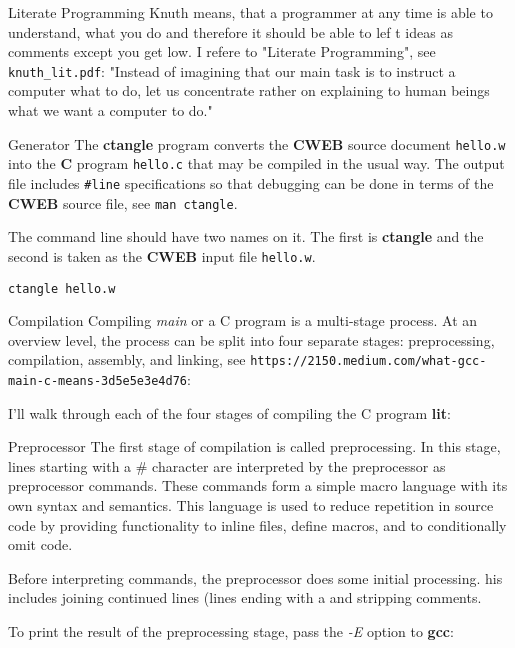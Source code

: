 

Literate Programming \hfill \break
Knuth means, that a programmer at any time is able to understand,
what you do and therefore it should be able to lef t ideas
as comments except you get low. I refere to "Literate Programming", see
{\tt knuth\_lit.pdf}: "Instead of imagining that our
main task is to instruct a computer what to do, let us
concentrate rather on explaining to human beings what
we want a computer to do."

\fi

Generator  \hfill \break
The {\bf ctangle} program converts the {\bf CWEB} source document {\tt hello.w}
into the {\bf C} program {\tt hello.c} that may be compiled in the usual way.
The output file includes{ \tt \#line} specifications so that debugging can be
done in terms of the {\bf CWEB} source file, see {\tt man ctangle}.

\vskip 4pt \noindent
The command line should have two names on it. The first is {\bf ctangle} and
the
second is taken as the {\bf CWEB} input file {\tt hello.w}.

\vskip 4pt \noindent
{\tt ctangle hello.w}

\fi

Compilation \hfill \break
Compiling {\sl main} or a C program is a multi-stage process. At an overview
level, the process can be split into four separate stages: preprocessing,
compilation, assembly, and linking, \hfill \break
see {\tt https://2150.medium.com/what-gcc-main-c-means-3d5e5e3e4d76}:

\vskip 4pt \noindent
I'll walk through each of the four stages of compiling the C program {\bf lit}:

\fi

Preprocessor  \hfill \break
The first stage of compilation is called preprocessing. In this stage,
lines starting with a \# character are interpreted by the preprocessor as
preprocessor commands. These commands form a simple macro language with its own
syntax and semantics. This language is used to reduce repetition in source code
by providing functionality to inline files, define macros, and to conditionally
omit code.

\vskip 4pt \noindent
Before interpreting commands, the preprocessor does some initial processing.
his includes joining continued lines (lines ending with a \) and stripping
comments.

\vskip 4pt \noindent
To print the result of the preprocessing stage, pass the {\sl -E} option to {%
\bf gcc}:

